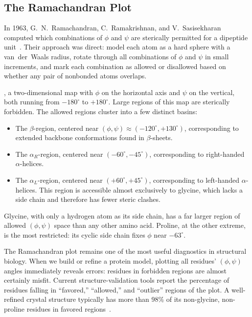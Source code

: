 \subsection{The Ramachandran Plot}
\label{sec:ramachandran}

In 1963, G.~N.~Ramachandran, C.~Ramakrishnan, and V.~Sasisekharan computed which combinations of $\phi$ and $\psi$ are sterically permitted for a dipeptide unit~\cite{ramachandran1963}.  Their approach was direct: model each atom as a hard sphere with a van~der~Waals radius, rotate through all combinations of $\phi$ and $\psi$ in small increments, and mark each combination as allowed or disallowed based on whether any pair of nonbonded atoms overlaps.

, a two-dimensional map with $\phi$ on the horizontal axis and $\psi$ on the vertical, both running from $-180^\circ$ to $+180^\circ$.  Large regions of this map are sterically forbidden.  The allowed regions cluster into a few distinct basins:
\begin{itemize}
  \item The $\beta$-region, centered near $(\phi, \psi) \approx (-120^\circ, +130^\circ)$, corresponding to extended backbone conformations found in $\beta$-sheets.
  \item The $\alpha_R$-region, centered near $(-60^\circ, -45^\circ)$, corresponding to right-handed $\alpha$-helices.
  \item The $\alpha_L$-region, centered near $(+60^\circ, +45^\circ)$, corresponding to left-handed $\alpha$-helices.  This region is accessible almost exclusively to glycine, which lacks a side chain and therefore has fewer steric clashes.
\end{itemize}

Glycine, with only a hydrogen atom as its side chain, has a far larger region of allowed $(\phi, \psi)$ space than any other amino acid.  Proline, at the other extreme, is the most restricted: its cyclic side chain fixes $\phi$ near $-63^\circ$.

The Ramachandran plot remains one of the most useful diagnostics in structural biology.  When we build or refine a protein model, plotting all residues' $(\phi, \psi)$ angles immediately reveals errors: residues in forbidden regions are almost certainly misfit.  Current structure-validation tools report the percentage of residues falling in ``favored,'' ``allowed,'' and ``outlier'' regions of the plot.  A well-refined crystal structure typically has more than 98\% of its non-glycine, non-proline residues in favored regions~\cite{lovell2003}.


